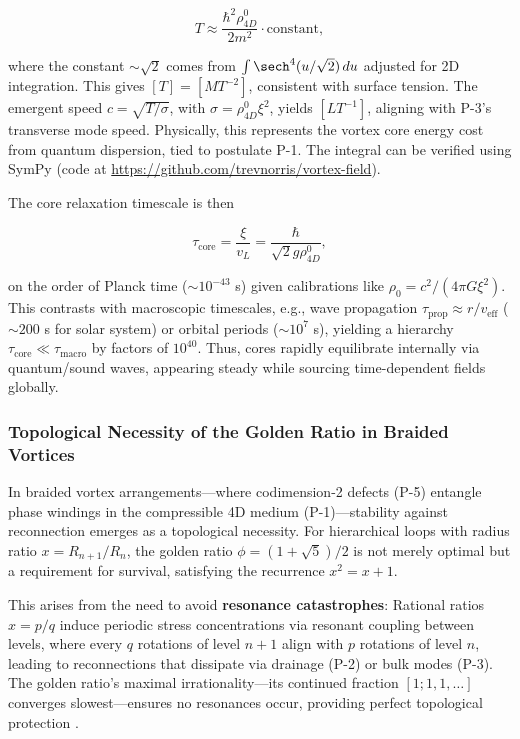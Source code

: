 \begin{equation}
T \approx \frac{\hbar^2 \rho_{4D}^0}{2 m^2} \cdot \text{constant},
\end{equation}

where the constant $\sim \sqrt{2}$ comes from $\int \sech^4(u / \sqrt{2}) \, du$ adjusted for 2D integration. This gives $[T] = [M T^{-2}]$, consistent with surface tension. The emergent speed $c = \sqrt{T / \sigma}$, with $\sigma = \rho_{4D}^0 \xi^2$, yields $[L T^{-1}]$, aligning with P-3's transverse mode speed. Physically, this represents the vortex core energy cost from quantum dispersion, tied to postulate P-1. The integral can be verified using SymPy (code at \url{https://github.com/trevnorris/vortex-field}).

The core relaxation timescale is then

\begin{equation}
\tau_{\text{core}} = \frac{\xi}{v_L} = \frac{\hbar}{\sqrt{2} g \rho_{4D}^0},
\end{equation}

on the order of Planck time ($\sim 10^{-43}$ s) given calibrations like $\rho_0 = c^2 / (4\pi G \xi^2)$. This contrasts with macroscopic timescales, e.g., wave propagation $\tau_{\text{prop}} \approx r / v_{\text{eff}}$ ($\sim 200$ s for solar system) or orbital periods ($\sim 10^7$ s), yielding a hierarchy $\tau_{\text{core}} \ll \tau_{\text{macro}}$ by factors of $10^{40}$. Thus, cores rapidly equilibrate internally via quantum/sound waves, appearing steady while sourcing time-dependent fields globally.

\subsubsection{Topological Necessity of the Golden Ratio in Braided Vortices}

In braided vortex arrangements---where codimension-2 defects (P-5) entangle phase windings in the compressible 4D medium (P-1)---stability against reconnection emerges as a topological necessity. For hierarchical loops with radius ratio $x = R_{n+1}/R_n$, the golden ratio $\phi = (1 + \sqrt{5})/2$ is not merely optimal but a requirement for survival, satisfying the recurrence $x^2 = x + 1$.

This arises from the need to avoid \textbf{resonance catastrophes}: Rational ratios $x = p/q$ induce periodic stress concentrations via resonant coupling between levels, where every $q$ rotations of level $n+1$ align with $p$ rotations of level $n$, leading to reconnections that dissipate via drainage (P-2) or bulk modes (P-3). The golden ratio's maximal irrationality---its continued fraction $[1; 1, 1, \ldots]$ converges slowest---ensures no resonances occur, providing perfect topological protection \cite{vortex_dynamics, braid_topology}.

